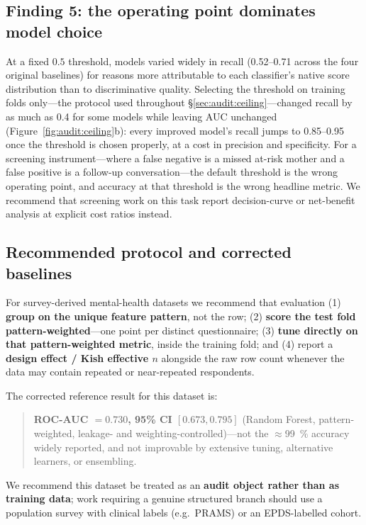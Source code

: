 \subsection{Finding 5: the operating point dominates model choice}
\label{sec:audit:threshold}

At a fixed $0.5$ threshold, models varied widely in recall (0.52--0.71 across the four original
baselines) for reasons more attributable to each classifier's native score distribution than to
discriminative quality. Selecting the threshold on training folds only---the protocol used
throughout \S\ref{sec:audit:ceiling}---changed recall by as much as 0.4 for some models while
leaving AUC unchanged (Figure~\ref{fig:audit:ceiling}b): every improved model's recall jumps to
0.85--0.95 once the threshold is chosen properly, at a cost in precision and specificity. For a
screening instrument---where a false negative is a missed at-risk mother and a false positive
is a follow-up conversation---the default threshold is the wrong operating point, and accuracy
at that threshold is the wrong headline metric. We recommend that screening work on this task
report decision-curve or net-benefit analysis at explicit cost ratios instead.

\subsection{Recommended protocol and corrected baselines}
\label{sec:audit:protocol}

For survey-derived mental-health datasets we recommend that evaluation (1) \textbf{group on the
unique feature pattern}, not the row; (2) \textbf{score the test fold pattern-weighted}---one
point per distinct questionnaire; (3) \textbf{tune directly on that pattern-weighted metric},
inside the training fold; and (4) report a \textbf{design effect / Kish effective $n$} alongside
the raw row count whenever the data may contain repeated or near-repeated respondents.

The corrected reference result for this dataset is:
\begin{quote}
  \textbf{ROC-AUC $= 0.730$, 95\% CI $[0.673, 0.795]$} (Random Forest, pattern-weighted,
  leakage- and weighting-controlled)---not the $\approx$\SI{99}{\percent} accuracy widely
  reported, and not improvable by extensive tuning, alternative learners, or ensembling.
\end{quote}

We recommend this dataset be treated as an \textbf{audit object rather than as training data};
work requiring a genuine structured branch should use a population survey with clinical labels
(e.g.\ PRAMS) or an EPDS-labelled cohort.

